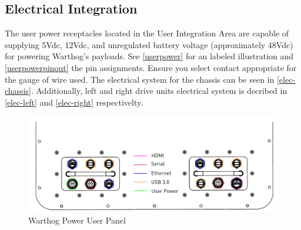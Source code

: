 \documentclass[]{clearpath-latex/clearpath-manual}
\begin{document}
\pagebreak[4]
\subsection{Electrical Integration}
\label{electrical}

The user power receptacles located in the User Integration Area are capable of supplying 5Vdc, 12Vdc, and unregulated battery voltage (approximately 48Vdc) for powering Warthog's payloads. See \autoref{userpower} for an labeled illustration and \autoref{userpowerpinout} the pin assignments. Ensure you select contact appropriate for the gauge of wire used.  The electrical system for the chassis can be seen in \autoref{elec-chassis}. Additionally, left and right drive units electrical system is decribed in \autoref{elec-left} and \autoref{elec-right} respectivelty.

\begin{figure}[!h]
  \centering
  \includegraphics[width=1.0\linewidth]{User_Panel_Labeled.pdf}
  \caption{Warthog Power User Panel}
  \label{userpower}
\end{figure}
\end{document}
